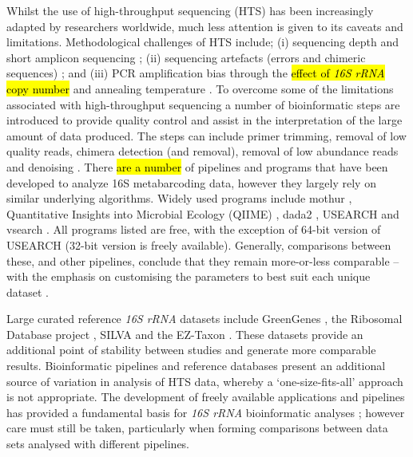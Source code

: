 \documentclass[a4paper, nobind]{templates/ociamthesis}
\begin{document}
Whilst the use of high-throughput sequencing (HTS) has been increasingly adapted by researchers worldwide, much less attention is given to its caveats and limitations. Methodological challenges of HTS include; (i) sequencing depth and short amplicon sequencing \autocite{gihringMassivelyParallelRRNA2012,houImpactNextgenerationSequencing2013,simsSequencingDepthCoverage2014}; (ii) sequencing artefacts (errors and chimeric sequences) \autocite{kuninWrinklesRareBiosphere2010,haasChimeric16SRRNA2011}; and (iii) PCR amplification bias through the \hl{effect of \emph{16S rRNA} copy number} \autocite{ahnEffectsPCRCycle2012} and annealing temperature \autocite{suzukiBiasCausedTemplate1996}.
To overcome some of the limitations associated with high-throughput sequencing a number of bioinformatic steps are introduced to provide quality control and assist in the interpretation of the large amount of data produced.
The steps can include primer trimming, removal of low quality reads, chimera detection (and removal), removal of low abundance reads and denoising \autocite{edgarSearchClusteringOrders2010,kuninWrinklesRareBiosphere2010,haasChimeric16SRRNA2011,edgarUNOISE2ImprovedErrorcorrection2016}.
There \hl{are a number} of pipelines and programs that have been developed to analyze 16S metabarcoding data, however they largely rely on similar underlying algorithms.
Widely used programs include mothur \autocite{schlossIntroducingMothurOpensource2009}, Quantitative Insights into Microbial Ecology (QIIME) \autocite{caporasoQIIMEAllowsAnalysis2010}, dada2 \autocite{callahanDADA2HighresolutionSample2016}, USEARCH \autocite{edgarSearchClusteringOrders2010} and vsearch \autocite{rognesVSEARCHVersatileOpen2016}.
All programs listed are free, with the exception of 64-bit version of USEARCH (32-bit version is freely available).
Generally, comparisons between these, and other pipelines, conclude that they remain more-or-less comparable -- with the emphasis on customising the parameters to best suit each unique dataset \autocite{nilakantaReviewSoftwareAnalyzing2014,plummerComparisonThreeBioinformatics2015,forsterComparisonThreeClustering2016}.

Large curated reference \emph{16S rRNA} datasets include GreenGenes \autocite{desantisGreengenesChimerachecked16S2006}, the Ribosomal Database project \autocite{coleRibosomalDatabaseProject2009}, SILVA \autocite{pruesseSILVAComprehensiveOnline2007} and the EZ-Taxon \autocite{chunEzTaxonWebbasedTool2007}.
These datasets provide an additional point of stability between studies and generate more comparable results.
Bioinformatic pipelines and reference databases present an additional source of variation in analysis of HTS data, whereby a `one-size-fits-all' approach is not appropriate.
The development of freely available applications and pipelines has provided a fundamental basis for \emph{16S rRNA} bioinformatic analyses \autocite{schlossIntroducingMothurOpensource2009,caporasoQIIMEAllowsAnalysis2010,edgarSearchClusteringOrders2010}; however care must still be taken, particularly when forming comparisons between data sets analysed with different pipelines.
\end{document}
